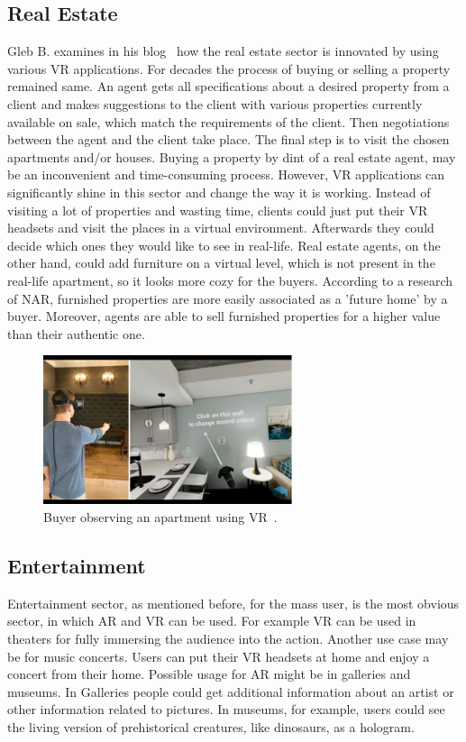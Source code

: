 \documentclass[12pt]{article}
\begin{document}
\subsection{Real Estate} \label{sec:Real Estate}
Gleb B. examines in his blog~\cite{realEstate} how the real estate sector is innovated by using various \ac{VR} applications. For decades the process of buying or selling a property remained same. An agent gets all specifications about a desired property from a client and makes suggestions to the client with various properties currently available on sale, which match the requirements of the client. Then negotiations between the agent and the client take place. The final step is to visit the chosen apartments and/or houses. Buying a property by dint of a real estate agent, may be an inconvenient and time-consuming process. However, \ac{VR} applications can significantly shine in this sector and change the way it is working. Instead of visiting a lot of properties and wasting time, clients could just put their \ac{VR} headsets and visit the places in a virtual environment. Afterwards they could decide which ones they would like to see in real-life. Real estate agents, on the other hand, could add furniture on a virtual level, which is not present in the real-life apartment, so it looks more cozy for the buyers. According to a research~\cite{realEstateResearch} of \ac{NAR}, furnished properties are more easily associated as a 'future home' by a buyer. Moreover, agents are able to sell furnished properties for a higher value than their authentic one.

\begin{figure} [ht]
    \centering
    \includegraphics[width=0.65\textwidth]{../images/realEstate.png}
    \caption{Buyer observing an apartment using \ac{VR}~\cite{realEstate}.}
    \label{fig:realEstate}
\end{figure}

\subsection{Entertainment} \label{sec:Entertainment}
Entertainment sector, as mentioned before, for the mass user, is the most obvious sector, in which \ac{AR} and \ac{VR} can be used. For example \ac{VR} can be used in theaters for fully immersing the audience into the action. Another use case may be for music concerts. Users can put their \ac{VR} headsets at home and enjoy a concert from their home. Possible usage for \ac{AR} might be in galleries and museums. In Galleries people could get additional information about an artist or other information related to pictures. In museums, for example, users could see the living version of prehistorical creatures, like dinosaurs, as a hologram.
\end{document}
